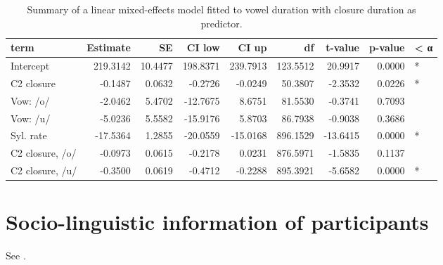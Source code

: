 \documentclass[preprint]{JASAnew}
\begin{document}
\begin{table}

\caption{\label{tab:vow-clo-table}Summary of a linear mixed-effects model fitted to vowel duration with closure duration as predictor.}
\centering
\begin{tabular}[t]{lrrrrrrrl}
\toprule
term & Estimate & SE & CI low & CI up & df & t-value & p-value & < α\\
\midrule
Intercept & 219.3142 & 10.4477 & 198.8371 & 239.7913 & 123.5512 & 20.9917 & 0.0000 & *\\
C2 closure & -0.1487 & 0.0632 & -0.2726 & -0.0249 & 50.3807 & -2.3532 & 0.0226 & *\\
Vow: /o/ & -2.0462 & 5.4702 & -12.7675 & 8.6751 & 81.5530 & -0.3741 & 0.7093 & \\
Vow: /u/ & -5.0236 & 5.5582 & -15.9176 & 5.8703 & 86.7938 & -0.9038 & 0.3686 & \\
Syl. rate & -17.5364 & 1.2855 & -20.0559 & -15.0168 & 896.1529 & -13.6415 & 0.0000 & *\\
\addlinespace
C2 closure, /o/ & -0.0973 & 0.0615 & -0.2178 & 0.0231 & 876.5971 & -1.5835 & 0.1137 & \\
C2 closure, /u/ & -0.3500 & 0.0619 & -0.4712 & -0.2288 & 895.3921 & -5.6582 & 0.0000 & *\\
\bottomrule
\end{tabular}
\end{table}

\section{Socio-linguistic information of
participants}\label{socio-linguistic-information-of-participants}

\label{a:socioling}

See .
\end{document}
